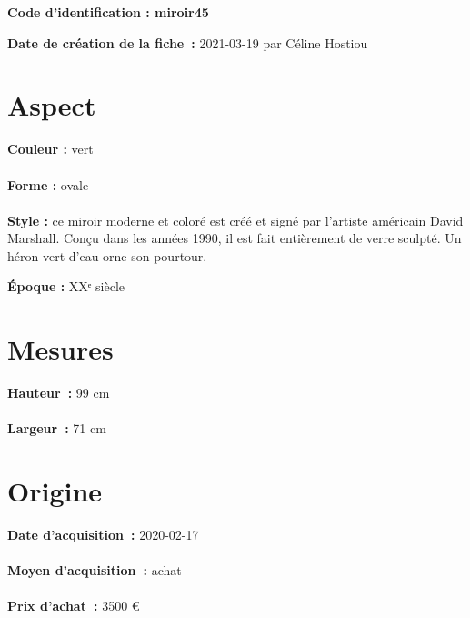 
     {\bf \huge Code d’identification : miroir45} \\
    \newline \hr \begin{center} 
       
    \end{center} 
    \begin{itemize}
    
    \footnotesize {\item {\bf Date de création de la fiche :} 2021-03-19
    {par Céline Hostiou}} 
    \end{itemize}
   \hr 
    \section* {Aspect} 
    {\bf \large Couleur :} vert
    \\ \\ {\bf \large Forme :} ovale 
    \\ \\ {\bf \large Style :} 
            ce miroir moderne et coloré est créé et signé par l’artiste américain David Marshall. 
            Conçu dans les années 1990, il est fait entièrement de verre sculpté. Un héron vert d’eau orne son pourtour.
         
        {\bf \large Époque :} XXᵉ siècle 
    \section* {Mesures}
     {\bf \large Hauteur :} 99 cm
   \\ \\ {\bf \large Largeur :} 71 cm 
  
    \section* {Origine}
    {\bf \large Date d’acquisition :} 2020-02-17 \\ \\
    {\bf \large Moyen d’acquisition :} achat \\ \\ {\bf \large Prix d’achat :}
        3500 € 
        
  